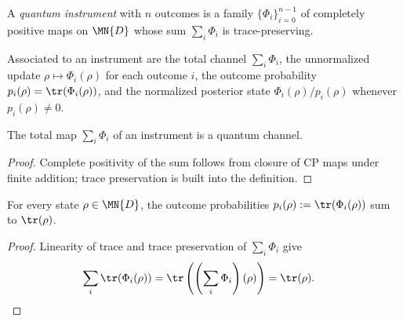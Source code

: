 \begin{definition}\label{def:instrument}
    \leanok
    A \emph{quantum instrument} with $n$ outcomes is a family
    $\{\Phi_i\}_{i=0}^{n-1}$ of completely positive maps on $\MN{D}$ whose
    sum $\sum_i\Phi_i$ is trace-preserving.
\end{definition}

\begin{definition}\label{def:instrument_operations}
    \leanok
    Associated to an instrument are the total channel $\sum_i\Phi_i$, the
    unnormalized update $\rho\mapsto\Phi_i(\rho)$ for each outcome $i$, the
    outcome probability $p_i(\rho)=\tr(\Phi_i(\rho))$, and the normalized
    posterior state $\Phi_i(\rho)/p_i(\rho)$ whenever $p_i(\rho)\neq0$.
\end{definition}

\begin{theorem}
    \label{thm:instrument_total_is_channel}
    \leanok
    The total map $\sum_i\Phi_i$ of an instrument is a quantum channel.
\end{theorem}

\begin{proof}
    \leanok
    Complete positivity of the sum follows from closure of CP maps under
    finite addition; trace preservation is built into the definition.
\end{proof}

\begin{theorem}
    \label{thm:instrument_sum_probability}
    \leanok
    For every state $\rho\in\MN{D}$, the outcome probabilities
    $p_i(\rho):=\tr(\Phi_i(\rho))$ sum to $\tr(\rho)$.
\end{theorem}

\begin{proof}
    \leanok
    Linearity of trace and trace preservation of $\sum_i\Phi_i$ give
    \begin{align}
        \sum_i\tr(\Phi_i(\rho))
        &=\tr\left(\left(\sum_i\Phi_i\right)(\rho)\right)
         =\tr(\rho).
        \notag
    \end{align}
\end{proof}

